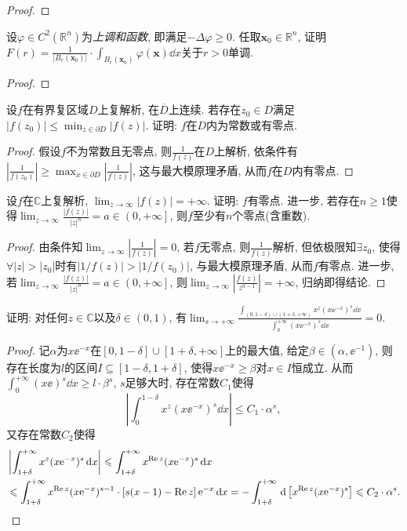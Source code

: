 \begin{quiza}
\begin{proof}
\end{proof}
\woe 设\(\varphi\in C^2(\mathbb{R}^n)\)为\textit{上调和函数}, 即满足\(-\Delta\varphi\geqslant 0\). 任取\(\boldsymbol{x}_0\in\mathbb{R}^n\), 证明\(F(r)=\frac{1}{|B_r(\boldsymbol{x}_0)|}\cdot\int_{B_r(\boldsymbol{x}_0)}\varphi(\boldsymbol{x})\dd x\)关于\(r>0\)单调.
\begin{proof}

\end{proof}
\woe 设\(f\)在有界复区域\(D\)上复解析, 在\(\overline{D}\)上连续. 若存在\(z_0\in D\)满足\(|f(z_0)|\leqslant\min_{z\in\partial D}|f(z)|\). 证明: \(f\)在\(D\)内为常数或有零点.
\begin{proof}
假设\(f\)不为常数且无零点, 则\(\frac{1}{f(z)}\)在\(D\)上解析, 依条件有\(\left|\frac{1}{f(z_0)}\right|\geqslant\max_{x\in\partial D}\left|\frac{1}{f(z)}\right|\), 这与最大模原理矛盾, 从而\(f\)在\(D\)内有零点.
\end{proof}
\woe 设\(f\)在\(\mathbb{C}\)上复解析, \(\lim_{z\rightarrow\infty}|f(z)|=+\infty\). 证明: \(f\)有零点. 进一步, 若存在\(n\geqslant 1\)使得\(\lim_{z\rightarrow\infty}\frac{|f(z)|}{|z|^n}=a\in\left(0,+\infty\right]\), 则\(f\)至少有\(n\)个零点(含重数).
\begin{proof}
由条件知\(\lim_{z\rightarrow\infty}\left|\frac{1}{f(z)}\right|=0\), 若\(f\)无零点, 则\(\frac{1}{f(z)}\)解析, 但依极限知\(\exists z_0\), 使得\(\forall |z|>|z_0|\)时有\(\left|1/f(z)\right|>\left|1/f(z_0)\right|\), 与最大模原理矛盾, 从而\(f\)有零点. 进一步, 若\(\lim_{z\rightarrow\infty}\frac{\left|f(z)\right|}{|z|^n}=a\in\left(0,+\infty\right]\), 则\(\lim_{z\rightarrow\infty}\left|\frac{f(z)}{z^{n-1}}\right|=+\infty\), 归纳即得结论. 
\end{proof}
\woe 证明: 对任何\(z\in\mathbb{C}\)以及\(\delta\in(0,1)\), 有\(\lim_{s\rightarrow+\infty}\frac{\displaystyle\int_{(0,1-\delta)\cup(1+\delta,+\infty)}x^z\left(x\ee^{-x}\right)^s\dd x}{\displaystyle\int_{0}^{+\infty}\left(x\ee^{-x}\right)^s\dd x}=0.\)
\begin{proof}
记\(\alpha\)为\(x\ee^{-x}\)在\([0,1-\delta]\cup[1+\delta,+\infty]\)上的最大值, 给定\(\beta\in(\alpha,\ee^{-1})\), 则存在长度为\(l\)的区间\(I\subseteq[1-\delta,1+\delta]\), 使得\(x\ee^{-x}\geqslant \beta\)对\(x\in I\)恒成立. 从而\(\int_{0}^{+\infty}\left(x\ee\right)^s\dd x\geqslant l\cdot\beta^s\), \(s\)足够大时, 存在常数\(C_1\)使得\[\left|\int_{0}^{1-\delta}x^z(x\ee^{-x})^{s}\dd x\right|\leqslant C_1\cdot\alpha^s,\]又存在常数\(C_2\)使得\[\begin{split}
&\left|\int_{1+\delta}^{+\infty}x^z(x\mathrm{e}^{-x})^s\,\mathrm{d} x\right|\leqslant\int_{1+\delta}^{+\infty}x^{\mathrm{Re}\,z}(x\mathrm{e}^{-x})^s\,\mathrm{d} x\\&\leqslant\int_{1+\delta}^{+\infty}x^{\mathrm{Re}\, z}(x\mathrm{e}^{-x})^{s-1}\cdot\left[s(x-1)-\mathrm{Re}\,z\right]\mathrm{e}^{-x}\,\mathrm{d} x=-\int_{1+\delta}^{+\infty}\,\mathrm{d}\left[x^{\mathrm{Re}\, z}(x\mathrm{e}^{-x})^s\right]\leqslant C_2\cdot\alpha^s.\qedhere
\end{split}\]
\end{proof}
\end{quiza}
